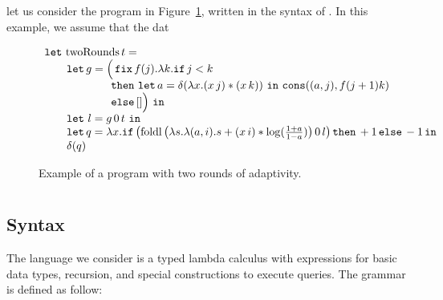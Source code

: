 \documentclass[acmsmall,review,anonymous]{acmart}\settopmatter{printfolios=true,printccs=false,printacmref=false}
\begin{document}
let us consider the program in Figure~\ref{fig:two-rounds}, written in the syntax of \THESYSTEM. In this example, we assume that the dat
\begin{figure}
  \centering
  $$
  \begin{array}{l}
    \mathop{\mathtt{let}}\, \mathrm{twoRounds}\, t = \\
\qquad \mathop{\mathtt{let}} g = \Big (\mathop{\mathtt{fix}} f(j).\lambda k.
	\mathtt{if}\,  j < k\, \\
\qquad \qquad \qquad \mathtt{then}\,  \mathop{\mathtt{let}} a = \delta(\lambda x. (x\, j) * (x\, k))\, 
	\mathop{ \mathtt{in}}\, 
	\mathop{\mathtt{cons}}((a,j), f (j +1) k)\\
\qquad \qquad \qquad \mathtt{else}\, [] \Big )\, \mathop{ \mathtt{in}}\,\\
\qquad \mathop{\mathtt{let}}\, l = g\, 0\, t\, \mathop{ \mathtt{in}}\\
\qquad \mathop{\mathtt{let}} q = \lambda x. \mathtt{if}\, \big (\mathrm{foldl}\, 
      \big (\lambda
    s. \lambda (a,i). s + (x\, i) * \log(\frac{1 + a}{1 - a} ) \big )\, 0\,
    l \big )\, \mathtt{then}\, +1\, \mathtt{else}\, -1
		\mathop{ \mathtt{in}} \\
\qquad \delta(q)
  \end{array}
  $$
  \caption{Example of a program with two rounds of adaptivity.}
  \label{fig:two-rounds}
\end{figure}


\section{\THESYSTEM}
\subsection{Syntax}
The language we consider is a typed lambda calculus with expressions
for basic data types, recursion, and special constructions to execute
queries. The grammar is defined as follow:
\end{document}
